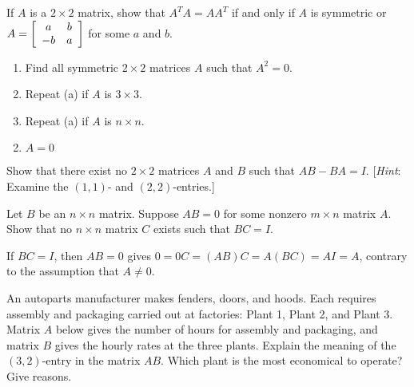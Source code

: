 \begin{multicols}{2}
\begin{ex}
If $A$ is a $2 \times 2$ matrix, show that \newline $A^{T}A = AA^{T}$ if and only if $A$ is symmetric or \newline $A = \left[ \begin{array}{cc}
a & b \\
-b & a
\end{array} \right]$
 for some $a$ and $b$.
\end{ex}

\begin{ex}
\begin{enumerate}[label={\alph*.}]
\item Find all symmetric $2 \times 2$ matrices $A$ such that $A^{2} = 0$.

\item Repeat (a) if $A$ is $3 \times 3$.

\item Repeat (a) if $A$ is $n \times n$.

\end{enumerate}
\begin{sol}
\begin{enumerate}[label={\alph*.}]
\setcounter{enumi}{1}
\item $A = 0$

\end{enumerate}
\end{sol}
\end{ex}

\begin{ex}
Show that there exist no $2 \times 2$ matrices $A$ and $B$ such that $AB - BA = I$. [\textit{Hint}: Examine the $(1, 1)$- and $(2, 2)$-entries.]
\end{ex}

\begin{ex}
Let $B$ be an $n \times n$ matrix. Suppose $AB = 0$ for some nonzero $m \times n$ matrix $A$. Show that no $n \times n$ matrix $C$ exists such that $BC = I$.

\begin{sol}
If $BC = I$, then $AB = 0$ gives $0 = 0C = (AB)C = A(BC) = AI = A$, contrary to the assumption that $A \neq 0$.
\end{sol}
\end{ex}

\begin{ex}
An autoparts manufacturer makes fenders, doors, and hoods. Each requires assembly and packaging carried out at factories: Plant 1, Plant 2, and Plant 3. Matrix $A$ below gives the number of hours for assembly and packaging, and matrix $B$ gives the hourly rates at the three plants. Explain the meaning of the $(3, 2)$-entry in the matrix $AB$. Which plant is the most economical to operate? Give reasons.


\end{ex}
\end{multicols}
